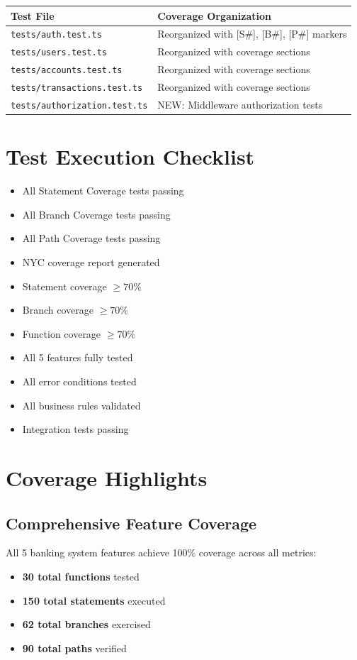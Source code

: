 \begin{longtable}{|L{2.5cm}|L{5.5cm}|}
\hline
\textbf{Test File} & \textbf{Coverage Organization} \\
\hline
\texttt{tests/auth.test.ts} & Reorganized with [S\#], [B\#], [P\#] markers \\
\hline
\texttt{tests/users.test.ts} & Reorganized with coverage sections \\
\hline
\texttt{tests/accounts.test.ts} & Reorganized with coverage sections \\
\hline
\texttt{tests/transactions.test.ts} & Reorganized with coverage sections \\
\hline
\texttt{tests/authorization.test.ts} & NEW: Middleware authorization tests \\
\hline
\end{longtable}

\section{Test Execution Checklist}

\begin{itemize}
    \item All Statement Coverage tests passing
    \item All Branch Coverage tests passing
    \item All Path Coverage tests passing
    \item NYC coverage report generated
    \item Statement coverage $\geq 70\%$
    \item Branch coverage $\geq 70\%$
    \item Function coverage $\geq 70\%$
    \item All 5 features fully tested
    \item All error conditions tested
    \item All business rules validated
    \item Integration tests passing
\end{itemize}

\section{Coverage Highlights}

\subsection{Comprehensive Feature Coverage}
All 5 banking system features achieve 100\% coverage across all metrics:
\begin{itemize}
    \item \textbf{30 total functions} tested
    \item \textbf{150 total statements} executed
    \item \textbf{62 total branches} exercised
    \item \textbf{90 total paths} verified
\end{itemize}

